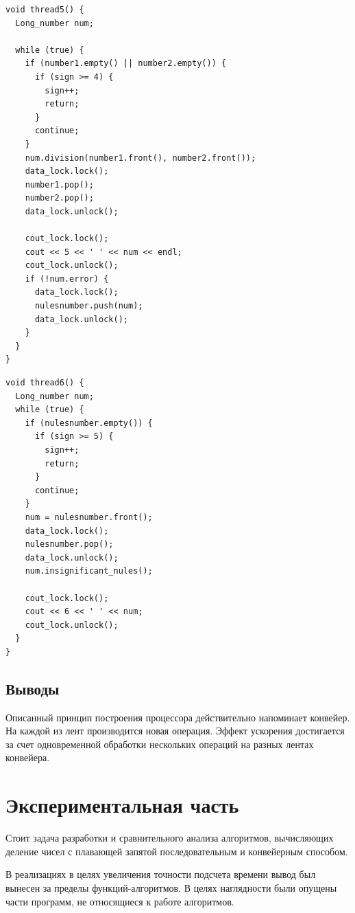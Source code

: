\documentclass[a4paper,14pt]{article} %
\begin{document}
\begin{lstlisting}[caption=Деление]
void thread5() {
  Long_number num;

  while (true) {
    if (number1.empty() || number2.empty()) {
      if (sign >= 4) {
        sign++;
        return;
      }
      continue;
    }
    num.division(number1.front(), number2.front());
    data_lock.lock();
    number1.pop();
    number2.pop();
    data_lock.unlock();

    cout_lock.lock();
    cout << 5 << ' ' << num << endl;
    cout_lock.unlock();
    if (!num.error) {
      data_lock.lock();
      nulesnumber.push(num);
      data_lock.unlock();
    }
  }
}
\end{lstlisting}

\begin{lstlisting}[caption=Удаление незначаших нулей из результата]
void thread6() {
  Long_number num;
  while (true) {
    if (nulesnumber.empty()) {
      if (sign >= 5) {
        sign++;
        return;
      }
      continue;
    }
    num = nulesnumber.front();
    data_lock.lock();
    nulesnumber.pop();
    data_lock.unlock();
    num.insignificant_nules();

    cout_lock.lock();
    cout << 6 << ' ' << num;
    cout_lock.unlock();
  }
}
\end{lstlisting}
        
	
 	\subsection{Выводы}
	\hfill
	
	Описанный принцип построения процессора действительно напоминает конвейер. На каждой из лент производится новая операция. Эффект ускорения достигается за счет одновременной обработки нескольких операций на разных лентах конвейера.
        
        \newpage
        

        \section{Экспериментальная часть}
        \hfill
        
       Стоит задача разработки и сравнительного анализа алгоритмов, вычисляющих деление чисел с плавающей запятой последовательным и конвейерным способом.
       
       В реализациях в целях увеличения точности подсчета времени вывод был вынесен за пределы функций-алгоритмов. В целях наглядности были опущены части программ, не относящиеся к работе алгоритмов.
\end{document}
